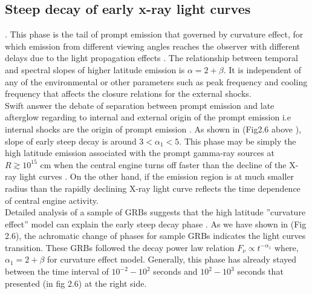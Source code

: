 \subsection{Steep decay of early x-ray light curves}.
This phase is the tail of prompt emission that governed by curvature
effect, for which emission from different viewing angles reaches the observer with
different delays due to the light propagation effects \citep{33}. The relationship between temporal and spectral slopes of higher latitude emission is $\alpha  = 2 + \beta $. It is independent of any of the environmental or other parameters such as peak frequency and cooling frequency that affects the closure relations for the external shocks.\\
Swift answer the debate of separation between prompt emission and late afterglow
regarding to internal and external origin of the prompt emission i.e internal
shocks are the origin of prompt emission \citep{33}. As shown in (Fig2.6 above ), slope of early steep decay is around $3 < \alpha_{1} < 5$.
This phase may be simply the high latitude emission associated with the prompt
gamma-ray sources at $ R \gtrsim 10^{15} $ cm when the central engine turns off faster than the decline of the X-ray light curves . On the other hand, if the emission region is at much smaller radius than the rapidly declining X-ray light curve reflects the time dependence of central engine activity\citep{36}.\\
Detailed analysis of a sample of GRBs suggests that the high latitude ”curvature
effect” model can explain the early steep decay phase \citep{37}. As we have shown in
(Fig 2.6), the achromatic change of phases for sample GRBs indicates the light
curves transition. These GRBs followed the decay power law relation $ F_{\nu}\propto  t^{-\alpha_{1}} $ where, $ \alpha_{1}  = 2 + \beta $ for curvature effect model. Generally, this phase has already stayed between the time interval of $ 10^{-2}  - 10^{2} $ seconds and $ 10^{2} - 10^{3} $ seconds that  presented (in fig 2.6) at the right side.\\\ 
